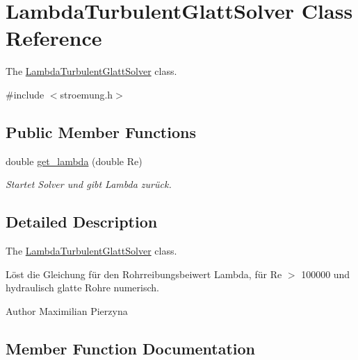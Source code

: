 \hypertarget{class_lambda_turbulent_glatt_solver}{}\section{Lambda\+Turbulent\+Glatt\+Solver Class Reference}
\label{class_lambda_turbulent_glatt_solver}


The \hyperlink{class_lambda_turbulent_glatt_solver}{Lambda\+Turbulent\+Glatt\+Solver} class.  




{\ttfamily \#include $<$stroemung.\+h$>$}

\subsection*{Public Member Functions}
\begin{DoxyCompactItemize}
\item 
double \hyperlink{class_lambda_turbulent_glatt_solver_a1d20c44a3ae5472c67d7f0ba852ee558}{get\+\_\+lambda} (double Re)
\begin{DoxyCompactList}\small\item\em Startet Solver und gibt Lambda zurück. \end{DoxyCompactList}\end{DoxyCompactItemize}


\subsection{Detailed Description}
The \hyperlink{class_lambda_turbulent_glatt_solver}{Lambda\+Turbulent\+Glatt\+Solver} class. 

Löst die Gleichung für den Rohrreibungsbeiwert Lambda, für Re $>$ 100000 und hydraulisch glatte Rohre numerisch.

\begin{DoxyAuthor}{Author}
Maximilian Pierzyna 
\end{DoxyAuthor}


\subsection{Member Function Documentation}
\mbox{\label{class_lambda_turbulent_glatt_solver_a1d20c44a3ae5472c67d7f0ba852ee558}} 
